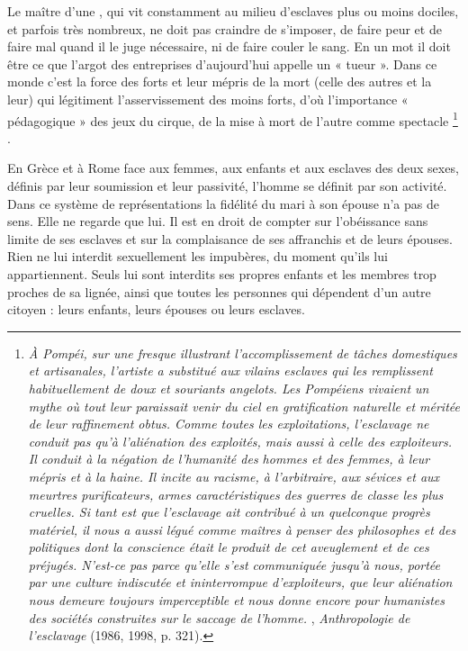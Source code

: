 Le maître d'une , qui vit constamment au milieu d'esclaves plus ou moins dociles, et parfois très nombreux, ne doit pas craindre de s'imposer, de faire peur et de faire mal quand il le juge nécessaire, ni de faire couler le sang. En un mot il doit être ce que l'argot des entreprises d'aujourd'hui appelle un « tueur ». Dans ce monde c'est la force des forts et leur mépris de la mort (celle des autres et la leur) qui légitiment l'asservissement des moins forts, d'où l'importance « pédagogique » des jeux du cirque, de la mise à mort de l'autre comme spectacle
\footnote{\emph{À Pompéi, sur une fresque illustrant l'accomplissement de tâches domestiques et artisanales, l'artiste a substitué aux vilains esclaves qui les remplissent habituellement de doux et souriants angelots. Les Pompéiens vivaient un mythe où tout leur paraissait venir du ciel en gratification naturelle et méritée de leur raffinement obtus. Comme toutes les exploitations, l'esclavage ne conduit pas qu'à l'aliénation des exploités, mais aussi à celle des exploiteurs. Il conduit à la négation de l'humanité des hommes et des femmes, à leur mépris et à la haine. Il incite au racisme, à l'arbitraire, aux sévices et aux meurtres purificateurs, armes caractéristiques des guerres de classe les plus cruelles. Si tant est que l'esclavage ait contribué à un quelconque progrès matériel, il nous a aussi légué comme maîtres à penser des philosophes et des politiques dont la conscience était le produit de cet aveuglement et de ces préjugés. N'est-ce pas parce qu'elle s'est communiquée jusqu'à nous, portée par une culture indiscutée et ininterrompue d'exploiteurs, que leur aliénation nous demeure toujours imperceptible et nous donne encore pour humanistes des sociétés construites sur le saccage de l'homme.} , \emph{Anthropologie de l'esclavage} (1986, 1998, p. 321).}%
.

 En Grèce et à Rome face aux femmes, aux enfants et aux esclaves des deux sexes, définis par leur soumission et leur passivité, l'homme se définit par son activité. Dans ce système de représentations la fidélité du mari à son épouse n'a pas de sens. Elle ne regarde que lui. Il est en droit de compter sur l'obéissance sans limite de ses esclaves et sur la complaisance de ses affranchis et de leurs épouses. Rien ne lui interdit sexuellement les impubères, du moment qu'ils lui appartiennent. Seuls lui sont interdits ses propres enfants et les membres trop proches de sa lignée, ainsi que toutes les personnes qui dépendent d'un autre citoyen : leurs enfants, leurs épouses ou leurs esclaves.

